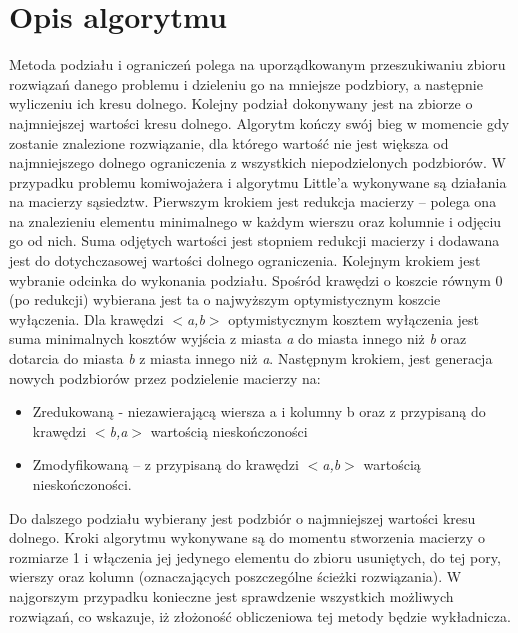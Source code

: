 \documentclass{article}
\begin{document}
\section{Opis algorytmu}
\par Metoda podziału i ograniczeń polega na uporządkowanym przeszukiwaniu zbioru rozwiązań danego problemu i dzieleniu go na mniejsze podzbiory, a następnie wyliczeniu ich kresu dolnego. Kolejny podział dokonywany jest na zbiorze o najmniejszej wartości kresu dolnego. Algorytm kończy swój bieg w momencie gdy zostanie znalezione rozwiązanie, dla którego wartość nie jest większa od najmniejszego dolnego ograniczenia z wszystkich niepodzielonych podzbiorów.
\newline
\newline
W przypadku problemu komiwojażera i algorytmu Little’a wykonywane są działania na macierzy sąsiedztw. Pierwszym krokiem jest redukcja macierzy – polega ona na znalezieniu elementu minimalnego w każdym wierszu oraz kolumnie i odjęciu go od nich. Suma odjętych wartości jest stopniem redukcji macierzy i dodawana jest do dotychczasowej wartości dolnego ograniczenia. Kolejnym krokiem jest wybranie odcinka do wykonania podziału. Spośród krawędzi o koszcie równym 0 (po redukcji) wybierana jest ta o najwyższym optymistycznym koszcie wyłączenia. Dla krawędzi $<$\textit{a,b}$>$ optymistycznym kosztem wyłączenia jest suma minimalnych kosztów wyjścia z miasta \textit{a} do miasta innego niż \textit{b} oraz dotarcia do miasta \textit{b} z miasta innego niż \textit{a}. Następnym krokiem, jest generacja nowych podzbiorów przez podzielenie macierzy na:

	\begin{itemize}
	\item Zredukowaną - niezawierającą wiersza a i kolumny b oraz z przypisaną do krawędzi $<$\textit{b,a}$>$ wartością nieskończoności
	\item Zmodyfikowaną – z przypisaną do krawędzi $<$\textit{a,b}$>$ wartością nieskończoności.
	\end{itemize}
Do dalszego podziału wybierany jest podzbiór o najmniejszej wartości kresu dolnego. Kroki algorytmu wykonywane są do momentu stworzenia macierzy o rozmiarze 1 i włączenia jej jedynego elementu do zbioru usuniętych, do tej pory, wierszy oraz kolumn (oznaczających poszczególne ścieżki rozwiązania).
\newline
\newline
W najgorszym przypadku konieczne jest sprawdzenie wszystkich możliwych rozwiązań, co wskazuje, iż złożoność obliczeniowa tej metody będzie wykładnicza.
\newline
\end{document}
